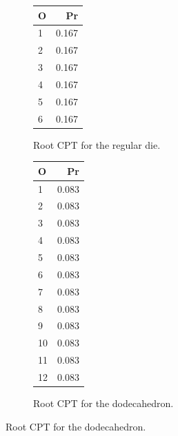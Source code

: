 \documentclass[
  10pt,
]{scrartcl}
\begin{document}
\begin{figure}[H]
\hspace{0.2cm}\begin{subfigure}[!ht]{0.25\textwidth}

\begin{tabular}{lr}
\toprule
O & Pr\\
\midrule
1 & 0.167\\
2 & 0.167\\
3 & 0.167\\
4 & 0.167\\
5 & 0.167\\
6 & 0.167\\
\bottomrule
\end{tabular}
\caption{Root CPT for the regular die.}
\end{subfigure} 
\hspace{0.2cm} \begin{subfigure}[!ht]{0.25\textwidth}

\begin{tabular}{lr}
\toprule
O & Pr\\
\midrule
1 & 0.083\\
2 & 0.083\\
3 & 0.083\\
4 & 0.083\\
5 & 0.083\\
6 & 0.083\\
7 & 0.083\\
8 & 0.083\\
9 & 0.083\\
10 & 0.083\\
11 & 0.083\\
12 & 0.083\\
\bottomrule
\end{tabular}
\caption{Root CPT for the dodecahedron.}
\end{subfigure}


\end{figure}
\end{document}
